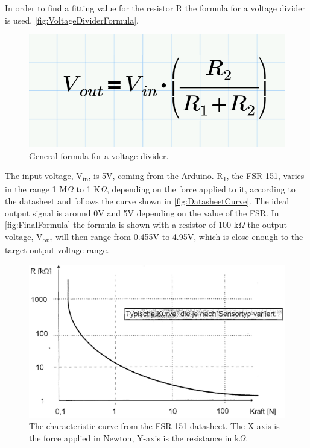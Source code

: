 In order to find a fitting value for the resistor R the formula for a voltage divider is used, \autoref{fig:VoltageDividerFormula}.
\begin{figure}[H]
\centering
\includegraphics[scale=0.15]{Figure/VoltageDividerFormula.png}
\caption{General formula for a voltage divider.}
\label{fig:VoltageDividerFormula}
\end{figure}

The input voltage, V\textsubscript{in}, is 5V, coming from the Arduino. R\textsubscript{1}, the FSR-151, varies in the range 1 M$\Omega$ to 1 K$\Omega$, depending on the force applied to it, according to the datasheet and follows the curve shown in \autoref{fig:DatasheetCurve}. The ideal output signal is around 0V and 5V depending on the value of the FSR. In \autoref{fig:FinalFormula} the formula is shown with a resistor of 100 k$\Omega$ the output voltage, V\textsubscript{out} will then range from 0.455V to 4.95V, which is close enough to the target output voltage range. 
\begin{figure}[H]
\centering
\includegraphics[scale=0.15]{Figure/DatasheetCurve.png}
\caption{The characteristic curve from the FSR-151 datasheet. The X-axis is the force applied in Newton, Y-axis is the resistance in k$\Omega$.}
\label{fig:DatasheetCurve}
\end{figure}

